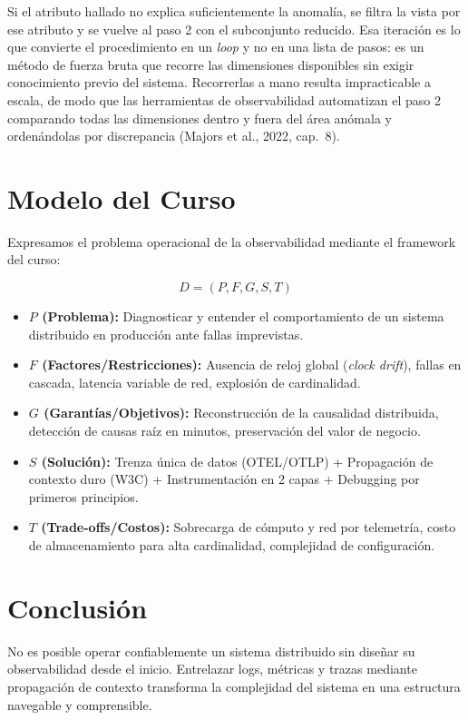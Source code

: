 \documentclass[variant=apuntes,cover=institutional,mode=screen]{ua-engineering-v6-article}
\begin{document}
Si el atributo hallado no explica suficientemente la anomalía, se filtra la vista por ese atributo y se vuelve al paso 2 con el subconjunto reducido. Esa iteración es lo que convierte el procedimiento en un \emph{loop} y no en una lista de pasos: es un método de fuerza bruta que recorre las dimensiones disponibles sin exigir conocimiento previo del sistema. Recorrerlas a mano resulta impracticable a escala, de modo que las herramientas de observabilidad automatizan el paso 2 comparando todas las dimensiones dentro y fuera del área anómala y ordenándolas por discrepancia (Majors et al., 2022, cap.~8).

\section{Modelo del Curso}

Expresamos el problema operacional de la observabilidad mediante el framework del curso:

\[
D = (P, F, G, S, T)
\]

\begin{itemize}
\item \textbf{$P$ (Problema):} Diagnosticar y entender el comportamiento de un sistema distribuido en producción ante fallas imprevistas.
\item \textbf{$F$ (Factores/Restricciones):} Ausencia de reloj global (\emph{clock drift}), fallas en cascada, latencia variable de red, explosión de cardinalidad.
\item \textbf{$G$ (Garantías/Objetivos):} Reconstrucción de la causalidad distribuida, detección de causas raíz en minutos, preservación del valor de negocio.
\item \textbf{$S$ (Solución):} Trenza única de datos (OTEL/OTLP) + Propagación de contexto duro (W3C) + Instrumentación en 2 capas + Debugging por primeros principios.
\item \textbf{$T$ (Trade-offs/Costos):} Sobrecarga de cómputo y red por telemetría, costo de almacenamiento para alta cardinalidad, complejidad de configuración.
\end{itemize}

\section{Conclusión}

No es posible operar confiablemente un sistema distribuido sin diseñar su observabilidad desde el inicio. Entrelazar logs, métricas y trazas mediante propagación de contexto transforma la complejidad del sistema en una estructura navegable y comprensible.
\end{document}
